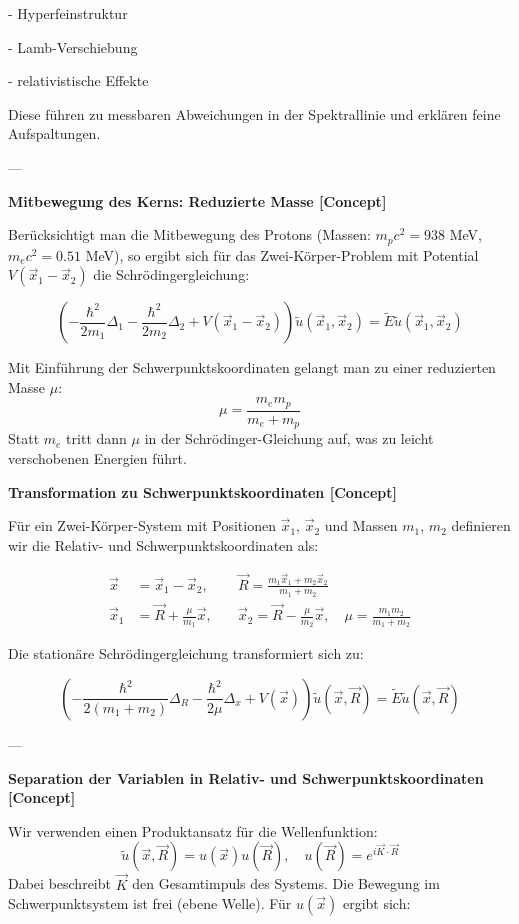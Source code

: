 \documentclass[10pt, letterpaper]{article}
\begin{document}
- Hyperfeinstruktur

- Lamb-Verschiebung

- relativistische Effekte

Diese führen zu messbaren Abweichungen in der Spektrallinie und erklären feine Aufspaltungen.

---

\textbf{Mitbewegung des Kerns: Reduzierte Masse [Concept]}

Berücksichtigt man die Mitbewegung des Protons (Massen: $m_p c^2 = 938$ MeV, $m_e c^2 = 0.51$ MeV), so ergibt sich für das Zwei-Körper-Problem mit Potential $V(\vec{x}_1 - \vec{x}_2)$ die Schrödingergleichung:

\[
\left( -\frac{\hbar^2}{2m_1} \Delta_1 - \frac{\hbar^2}{2m_2} \Delta_2 + V(\vec{x}_1 - \vec{x}_2) \right) \tilde{u}(\vec{x}_1, \vec{x}_2) = \tilde{E} \tilde{u}(\vec{x}_1, \vec{x}_2)
\]

Mit Einführung der Schwerpunktskoordinaten gelangt man zu einer reduzierten Masse $\mu$:
\[
\mu = \frac{m_e m_p}{m_e + m_p}
\]
Statt $m_e$ tritt dann $\mu$ in der Schrödinger-Gleichung auf, was zu leicht verschobenen Energien führt.

\textbf{Transformation zu Schwerpunktskoordinaten [Concept]}

Für ein Zwei-Körper-System mit Positionen $\vec{x}_1$, $\vec{x}_2$ und Massen $m_1$, $m_2$ definieren wir die Relativ- und Schwerpunktskoordinaten als:

\[
\begin{aligned}
\vec{x} &= \vec{x}_1 - \vec{x}_2, \quad & \vec{R} = \frac{m_1 \vec{x}_1 + m_2 \vec{x}_2}{m_1 + m_2} \\
\vec{x}_1 &= \vec{R} + \frac{\mu}{m_1} \vec{x}, \quad & \vec{x}_2 = \vec{R} - \frac{\mu}{m_2} \vec{x}, \quad \mu = \frac{m_1 m_2}{m_1 + m_2}
\end{aligned}
\]

Die stationäre Schrödingergleichung transformiert sich zu:

\[
\left( -\frac{\hbar^2}{2(m_1 + m_2)} \Delta_R - \frac{\hbar^2}{2\mu} \Delta_x + V(\vec{x}) \right) \tilde{u}(\vec{x}, \vec{R}) = \tilde{E} \tilde{u}(\vec{x}, \vec{R})
\]

---

\textbf{Separation der Variablen in Relativ- und Schwerpunktskoordinaten [Concept]}

Wir verwenden einen Produktansatz für die Wellenfunktion:
\[
\tilde{u}(\vec{x}, \vec{R}) = u(\vec{x}) u(\vec{R}), \quad u(\vec{R}) = e^{i \vec{K} \cdot \vec{R}}
\]
Dabei beschreibt $\vec{K}$ den Gesamtimpuls des Systems. Die Bewegung im Schwerpunktsystem ist frei (ebene Welle). Für $u(\vec{x})$ ergibt sich:
\end{document}
